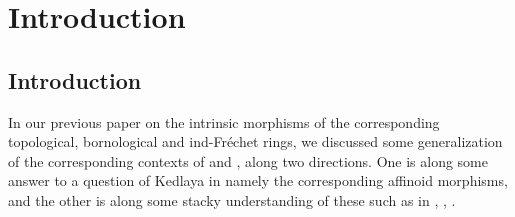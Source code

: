 \documentclass[11pt]{book}
\theoremstyle{definition}
\numberwithin{equation}{section}
\begin{document}
\newpage

\chapter{Introduction}


\section{Introduction}



\indent In our previous paper \cite{12XT1} on the intrinsic morphisms of the corresponding topological, bornological and ind-Fr\'echet rings, we discussed some generalization of the corresponding contexts of \cite{12Huber1} and \cite{12Huber2}, along two directions. One is along some answer to a question of Kedlaya in \cite[Appendix 5]{12Ked1} namely the corresponding affinoid morphisms, and the other is along some stacky understanding of these such as in \cite{12Dr1}, \cite{12Dr2}, \cite{12R}.\\
\end{document}

